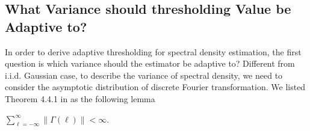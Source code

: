 \subsection{What Variance should thresholding Value be Adaptive to?}
In order to derive adaptive thresholding for spectral density estimation, the first question is 
which variance should the estimator be adaptive to? 
Different from i.i.d. Gaussian case, to describe the variance of spectral density, we need to consider the asymptotic distribution of discrete Fourier transformation. We listed Theorem 4.4.1 in  \cite{brillinger2001time} as the following lemma 
\begin{assumption}\label{assumption:finite_auto}
$\sum_{\ell=-\infty}^\infty \|\Gamma(\ell)\|<\infty$. 
\end{assumption}

